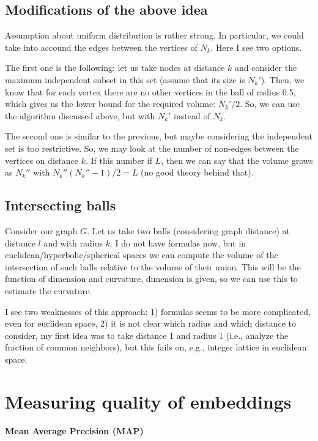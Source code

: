 \documentclass{article}
\begin{document}
\subsection{Modifications of the above idea}

Assumption about uniform distribution is rather strong. In particular, we could take into accound the edges between the vertices of $N_k$. Here I see two options.

The first one is the following: let us take nodes at distance $k$ and consider the maximum independent subset in this set (assume that its size is $N_k'$). Then, we know that for each vertex there are no other vertices in the ball of radius 0.5, which gives us the lower bound for the required volume: $N_k'/2$. So, we can use the algorithm discussed above, but with $N_k'$ instead of $N_k$.

The second one is similar to the previous, but maybe considering the independent set is too restrictive. So, we may look at the number of non-edges between the vertices on distance $k$. If this number if $L$, then we can say that the volume grows as $N_k''$ with $N_k''(N_k''-1)/2 = L$ (no good theory behind that).

\subsection{Intersecting balls}

Consider our graph $G$. Let us take two balls (considering graph distance) at distance $l$ and with radius $k$. I do not have formulas now, but in euclidean/hyperbolic/spherical spaces we can compute the volume of the intersection of such balls relative to the volume of their union. This will be the function of dimension and curvature, dimension is given, so we can use this to estimate the curvature.

I see two weaknesses of this approach: 1) formulas seems to be more complicated, even for euclidean space, 2) it is not clear which radius and which distance to consider, my first idea was to take distance 1 and radius 1 (i.e., analyze the fraction of common neighbors), but this fails on, e.g., integer lattice in euclidean space.


\section{Measuring quality of embeddings}



\paragraph{Mean Average Precision (MAP)}
\end{document}
